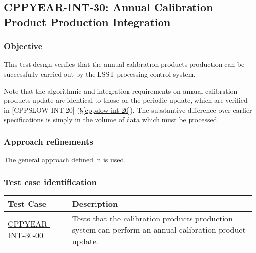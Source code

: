 \subsection{CPPYEAR-INT-30: Annual Calibration Product Production Integration}
\label{cppyear-int-30}

\subsubsection{Objective}

This test design verifies that the annual calibration products production can
be successfully carried out by the LSST processing control system.

Note that the algorithmic and integration requirements on annual calibration
products update are identical to those on the periodic update, which are
verified in \hyperref[cppslow-int-20][CPPSLOW-INT-20]
(\S\ref{cppslow-int-20}). The substantive difference over earlier
specifications is simply in the volume of data which must be processed.

\subsubsection{Approach refinements}

The general approach defined in  is used.

\subsubsection{Test case identification}

\begin{longtable} {|p{}|p{}|}\hline
\textbf{Test Case}  & \textbf{Description} \\\hline

\hyperref[cppyear-int-30-00]{CPPYEAR-INT-30-00} & Tests that the calibration products production system can perform an annual calibration product update.\\\hline
\end{longtable}
